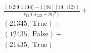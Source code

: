 \documentclass[varwidth, border=5pt]{standalone}
\begin{document}
\begin{my}
$\begin{gathered}
\scriptscriptstyle\frac{(1⟨2|𝟑|1]⟨𝟑𝟒⟩-1[𝟑1][1𝟒]⟨12⟩)}{s_{12}(s_{12𝟑}-m_t²)} +\\
\scriptscriptstyle(21345,\;\text{True}) +\\
\scriptscriptstyle(12435,\;\text{False}) +\\
\scriptscriptstyle(21435,\;\text{True}) \phantom{+}
\end{gathered}$
\end{my}
\end{document}
